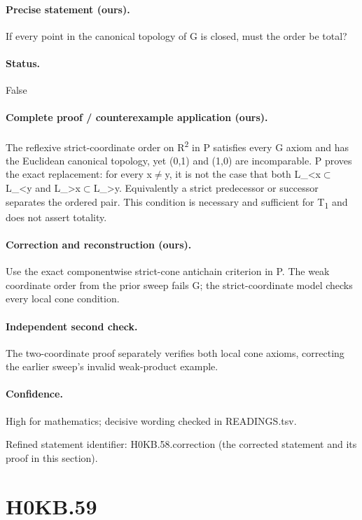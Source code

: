 \paragraph{Precise statement (ours).} If every point in the canonical topology of G is closed, must the order be total?

\paragraph{Status.} False

\paragraph{Complete proof / counterexample application (ours).} The reflexive strict-coordinate order on R\textsuperscript{2} in P satisfies every G axiom and has the Euclidean canonical topology, yet (0,1) and (1,0) are incomparable. P proves the exact replacement: for every x\ensuremath{\ne}y, it is not the case that both L\_<x\ensuremath{\subset}L\_<y and L\_>x\ensuremath{\subset}L\_>y. Equivalently a strict predecessor or successor separates the ordered pair. This condition is necessary and sufficient for T\textsubscript{1} and does not assert totality.

\paragraph{Correction and reconstruction (ours).} Use the exact componentwise strict-cone antichain criterion in P. The weak coordinate order from the prior sweep fails G; the strict-coordinate model checks every local cone condition.

\paragraph{Independent second check.} The two-coordinate proof separately verifies both local cone axioms, correcting the earlier sweep’s invalid weak-product example.

\paragraph{Confidence.} High for mathematics; decisive wording checked in READINGS.tsv.

\noindent Refined statement identifier: H0KB.58.correction (the corrected statement and its proof in this section).

\section*{H0KB.59}\label{statement:H0KB.59}
